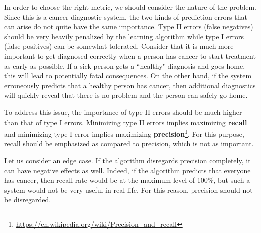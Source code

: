 \documentclass[10pt, a4paper]{article}
\begin{document}
In order to choose the right metric, we should consider the nature of the problem. Since this is a cancer diagnostic system, the two kinds of prediction errors that can arise do not quite have the same importance. Type II errors (false negatives) should be very heavily penalized by the learning algorithm while type I errors (false positives) can be somewhat tolerated. Consider that it is much more important to get diagnosed correctly when a person has cancer to start treatment as early as possible. If a sick person gets a ``healthy" diagnosis and goes home, this will lead to potentially fatal consequences. On the other hand, if the system erroneously predicts that a healthy person has cancer, then additional diagnostics will quickly reveal that there is no problem and the person can safely go home.

To address this issue, the importance of type II errors should be much higher than that of type I errors. Minimizing type II errors implies maximizing \textbf{recall} and minimizing type I error implies maximizing \textbf{precision}\footnote{\scriptsize \url{https://en.wikipedia.org/wiki/Precision_and_recall}}. For this purpose, recall should be emphasized as compared to precision, which is not as important.

Let us consider an edge case. If the algorithm disregards precision completely, it can have negative effects as well. Indeed, if the algorithm predicts that everyone has cancer, then recall rate would be at the maximum level of 100\%, but such a system would not be very useful in real life. For this reason, precision should not be disregarded.
\end{document}
